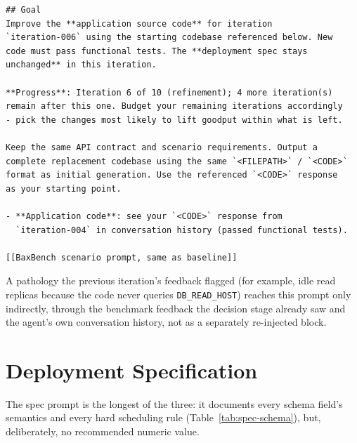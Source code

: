\small
\begin{verbatim}
## Goal
Improve the **application source code** for iteration
`iteration-006` using the starting codebase referenced below. New
code must pass functional tests. The **deployment spec stays
unchanged** in this iteration.

**Progress**: Iteration 6 of 10 (refinement); 4 more iteration(s)
remain after this one. Budget your remaining iterations accordingly
- pick the changes most likely to lift goodput within what is left.

Keep the same API contract and scenario requirements. Output a
complete replacement codebase using the same `<FILEPATH>` / `<CODE>`
format as initial generation. Use the referenced `<CODE>` response
as your starting point.

- **Application code**: see your `<CODE>` response from
  `iteration-004` in conversation history (passed functional tests).

[[BaxBench scenario prompt, same as baseline]]
\end{verbatim}
\normalsize

A pathology the previous iteration's feedback flagged (for example, idle
read replicas because the code never queries \texttt{DB\_READ\_HOST})
reaches this prompt only indirectly, through the benchmark feedback the
decision stage already saw and the agent's own conversation history, not
as a separately re-injected block.


\section{Deployment Specification}
\label{sec:appendix-prompts-spec}

The spec prompt is the longest of the three: it documents every schema
field's semantics and every hard scheduling rule
(Table~\ref{tab:spec-schema}), but, deliberately, no recommended numeric
value.

